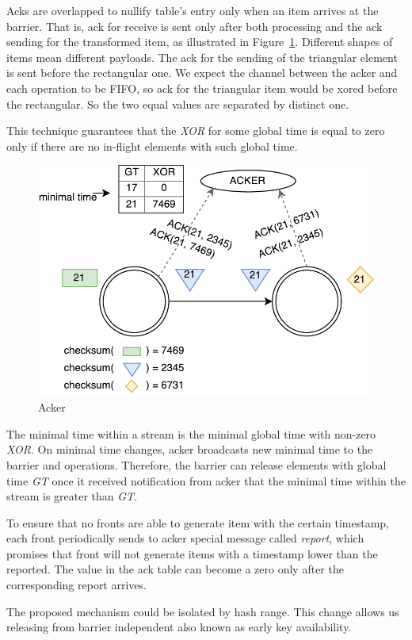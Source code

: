 Acks are overlapped to nullify table's entry only when an item arrives at the barrier. That is, ack for receive is sent only after both processing and the ack sending for the transformed item, as illustrated in Figure~\ref{acker}. Different shapes of items mean different payloads. The ack for the sending of the triangular element is sent before the rectangular one. We expect the channel between the acker and each operation to be FIFO, so ack for the triangular item would be xored before the rectangular. So the two equal values are separated by distinct one. 

This technique guarantees that the {\it XOR} for some global time is equal to zero only if there are no in-flight elements with such global time.

\begin{figure}[htbp]
  \centering
  \includegraphics[scale=0.5]{pics/acker}
  \caption{Acker}
  \label {acker}
\end{figure}

The minimal time within a stream is the minimal global time with non-zero {\it XOR}. On minimal time changes, acker broadcasts new minimal time to the barrier and operations. Therefore, the barrier can release elements with global time {\it GT} once it received notification from acker that the minimal time within the stream is greater than {\it GT}.

To ensure that no fronts are able to generate item with the certain timestamp, each front periodically sends to acker special message called {\it report}, which promises that front will not generate items with a timestamp lower than the reported. The value in the ack table can become a zero only after the corresponding report arrives.

The proposed mechanism could be isolated by hash range. This change allows us releasing from barrier independent also known as early key availability.

